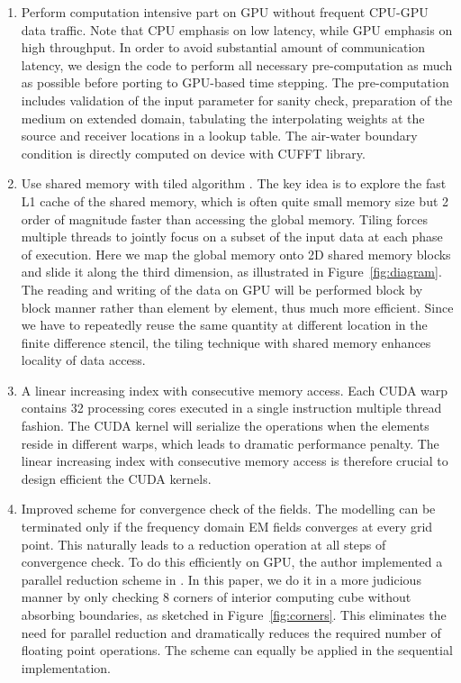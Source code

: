 \documentclass[a4paper,10pt]{article}
\begin{document}
\begin{enumerate}

  \item Perform computation intensive part on GPU without frequent CPU-GPU data traffic. Note that  CPU emphasis on low latency, while GPU emphasis on high throughput. In order to avoid substantial amount of communication latency, we design the code to perform all necessary pre-computation as much as possible before porting to GPU-based time stepping. The pre-computation includes validation of the input parameter for sanity check, preparation of the medium on extended domain, tabulating the interpolating weights at the source and receiver locations in a lookup table. 
 The air-water boundary condition is directly computed on device with CUFFT library.

 \item Use shared memory with tiled algorithm \citep{micikevicius20093d}.
 The key idea is to explore the fast L1 cache of the shared memory, which is often quite small memory size but 2 order of magnitude faster than accessing the global memory. Tiling forces multiple threads to jointly focus on a subset of the input data at each phase of execution.
 Here we map the global memory onto 2D shared memory blocks and slide it along the third dimension, as illustrated in Figure~\ref{fig:diagram}.
 The reading and writing of the data on GPU will be performed block by block manner rather than element by element, thus much more efficient. 
 Since we have to repeatedly reuse the same quantity at different location in the finite difference stencil, the tiling technique with shared memory enhances locality of data access. 

 
\item A linear increasing index with consecutive memory access.  Each CUDA warp contains 32 processing cores executed in a single instruction multiple thread fashion. The CUDA kernel will serialize the operations when the elements reside in different warps, which leads to dramatic performance penalty. The linear increasing index with consecutive memory access is therefore crucial to design efficient the CUDA kernels.

\item Improved scheme for convergence check of the fields.
The modelling can be terminated only if the frequency domain EM fields converges at every grid point. This naturally leads to a reduction operation at all steps of convergence check. To do this efficiently on GPU, the author implemented a parallel reduction scheme in \citep{Yang_2021_GPU_CSEM}. In this paper, we do it in a more judicious manner by only checking 8 corners of interior computing cube without absorbing boundaries, as sketched in Figure~\ref{fig:corners}. This eliminates the need for parallel reduction and dramatically reduces the required number of floating point operations. The scheme can equally be applied in the sequential implementation.


\end{enumerate}
\end{document}
